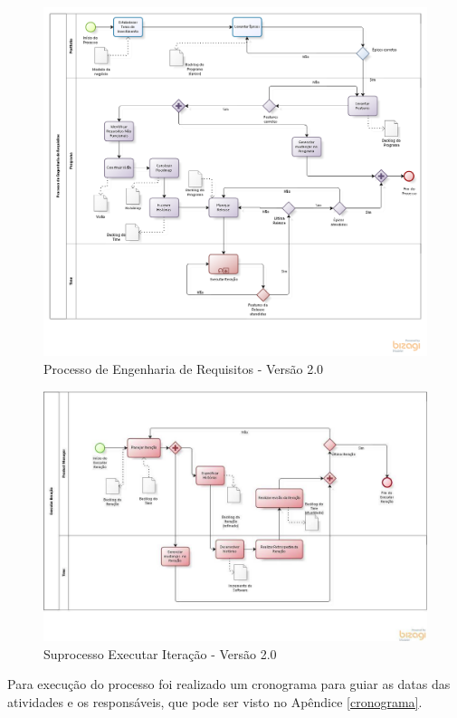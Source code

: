 \pagebreak
\begin{figure}[!htb]
\flushleft
\includegraphics[scale=0.6]{figuras/processo3.png}
\caption{Processo de Engenharia de Requisitos - Versão 2.0}
\label{fig:Processo}
\end{figure}

\begin{figure}[!htb]
\flushleft
\includegraphics[scale=0.4]{figuras/iteracao2.png}
\caption{Suprocesso Executar Iteração - Versão 2.0}
\label{fig:iteracao}
\end{figure}

Para execução do processo foi realizado um cronograma para guiar as datas das atividades e os responsáveis, que pode ser visto no Apêndice \ref{cronograma}.
\pagebreak


% 
% 
% 